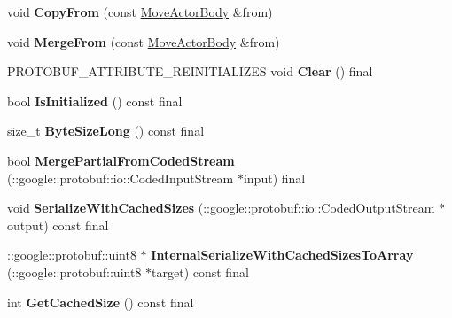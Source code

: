 \begin{DoxyCompactItemize}
void {\bfseries Copy\+From} (const \hyperlink{classtbBasics_1_1MoveActorBody}{Move\+Actor\+Body} \&from)
\item 
\mbox{\label{classtbBasics_1_1MoveActorBody_ae43e943cda0b68c442d2d8e53e3c0932}} 
void {\bfseries Merge\+From} (const \hyperlink{classtbBasics_1_1MoveActorBody}{Move\+Actor\+Body} \&from)
\item 
\mbox{\label{classtbBasics_1_1MoveActorBody_a918daecba462396959f029d81aff6539}} 
P\+R\+O\+T\+O\+B\+U\+F\+\_\+\+A\+T\+T\+R\+I\+B\+U\+T\+E\+\_\+\+R\+E\+I\+N\+I\+T\+I\+A\+L\+I\+Z\+ES void {\bfseries Clear} () final
\item 
\mbox{\label{classtbBasics_1_1MoveActorBody_a4d6f2041f2cea71161f887cc0edfc170}} 
bool {\bfseries Is\+Initialized} () const final
\item 
\mbox{\label{classtbBasics_1_1MoveActorBody_a2de966814b286d3abba1ffd515a193f4}} 
size\+\_\+t {\bfseries Byte\+Size\+Long} () const final
\item 
\mbox{\label{classtbBasics_1_1MoveActorBody_af8182079920fae45dd135b3891688371}} 
bool {\bfseries Merge\+Partial\+From\+Coded\+Stream} (\+::google\+::protobuf\+::io\+::\+Coded\+Input\+Stream $\ast$input) final
\item 
\mbox{\label{classtbBasics_1_1MoveActorBody_aa20ac7b354fc37ac2c6edfb8a6e2b29d}} 
void {\bfseries Serialize\+With\+Cached\+Sizes} (\+::google\+::protobuf\+::io\+::\+Coded\+Output\+Stream $\ast$output) const final
\item 
\mbox{\label{classtbBasics_1_1MoveActorBody_a1eb54d1cfafcad69409de18954bdd7ec}} 
\+::google\+::protobuf\+::uint8 $\ast$ {\bfseries Internal\+Serialize\+With\+Cached\+Sizes\+To\+Array} (\+::google\+::protobuf\+::uint8 $\ast$target) const final
\item 
\mbox{\label{classtbBasics_1_1MoveActorBody_a3f7dbec17da729917652e0b8f42ba9cd}} 
int {\bfseries Get\+Cached\+Size} () const final
\item 

\end{DoxyCompactItemize}
